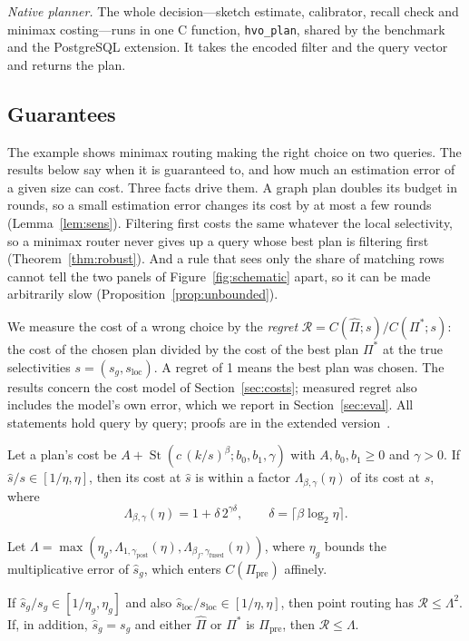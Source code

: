 \documentclass[sigconf, nonacm]{acmart}
\newcommand{\sg}{s_g}
\newcommand{\sloc}{s_{\text{loc}}}
\newcommand{\Ppre}{\Pi_{\text{pre}}}
\begin{document}
\emph{Native planner.} The whole decision---sketch estimate, calibrator, recall check and minimax costing---runs in one C function, \texttt{hvo\_plan}, shared by the benchmark and the PostgreSQL extension. It takes the encoded filter and the query vector and returns the plan.

\subsection{Guarantees}\label{sec:theory}
The example shows minimax routing making the right choice on two queries. The results below say when it is guaranteed to, and how much an estimation error of a given size can cost. Three facts drive them. A graph plan doubles its budget in rounds, so a small estimation error changes its cost by at most a few rounds (Lemma~\ref{lem:sens}). Filtering first costs the same whatever the local selectivity, so a minimax router never gives up a query whose best plan is filtering first (Theorem~\ref{thm:robust}). And a rule that sees only the share of matching rows cannot tell the two panels of Figure~\ref{fig:schematic} apart, so it can be made arbitrarily slow (Proposition~\ref{prop:unbounded}).

We measure the cost of a wrong choice by the \emph{regret} $\mathcal{R}=C(\hat\Pi;s)/C(\Pi^*;s)$: the cost of the chosen plan divided by the cost of the best plan $\Pi^*$ at the true selectivities $s=(\sg,\sloc)$. A regret of 1 means the best plan was chosen. The results concern the cost model of Section~\ref{sec:costs}; measured regret also includes the model's own error, which we report in Section~\ref{sec:eval}. All statements hold query by query; proofs are in the extended version~\cite{hvoextended}.
\begin{lemma}\label{lem:sens}
Let a plan's cost be $A+\operatorname{St}(c\,(k/s)^\beta;b_0,b_1,\gamma)$ with $A,b_0,b_1\ge0$ and $\gamma>0$. If $\hat s/s\in[1/\eta,\eta]$, then its cost at $\hat s$ is within a factor $\Lambda_{\beta,\gamma}(\eta)$ of its cost at $s$, where
\[
\Lambda_{\beta,\gamma}(\eta)=1+\delta\,2^{\gamma\delta},\qquad \delta=\lceil\beta\log_2\eta\rceil .
\]
\end{lemma}

Let $\Lambda=\max(\eta_g,\Lambda_{1,\gamma_{\text{post}}}(\eta),\Lambda_{\beta_f,\gamma_{\text{fused}}}(\eta))$, where $\eta_g$ bounds the multiplicative error of $\hat s_g$, which enters $C(\Ppre)$ affinely.

\begin{theorem}\label{thm:regret}
If $\hat s_g/\sg\in[1/\eta_g,\eta_g]$ and also $\hat s_{\text{loc}}/\sloc\in[1/\eta,\eta]$, then point routing has $\mathcal{R}\le\Lambda^2$. If, in addition, $\hat s_g=\sg$ and either $\hat\Pi$ or $\Pi^*$ is $\Ppre$, then $\mathcal{R}\le\Lambda$.
\end{theorem}
\end{document}
